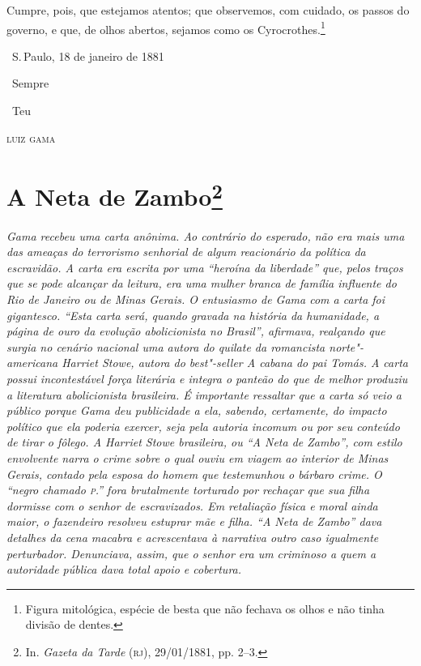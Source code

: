 Cumpre, pois, que estejamos atentos; que observemos, com cuidado, os
passos do governo, e que, de olhos abertos, sejamos como os
Cyrocrothes.\footnote{Figura mitológica, espécie de besta que não
  fechava os olhos e não tinha divisão de dentes.}

\hfill\ S.\,Paulo, 18 de janeiro de 1881\smallskip

\hfill\ Sempre

\hfill\ Teu

\hfill\textsc{luiz gama}


\chapter{A Neta de Zambo\footnote[*]{In.
  \emph{Gazeta da Tarde} (\textsc{rj}), 29/01/1881, pp. 2--3.}}

\begin{flushleft}
{\footnotesize\itshape
Gama recebeu uma carta anônima. Ao contrário do esperado,
não era mais uma das ameaças do terrorismo
senhorial de algum reacionário da política da escravidão.
A carta era escrita por uma ``heroína da liberdade'' que, pelos
traços que se pode alcançar da leitura, era uma mulher branca de família
influente do Rio de Janeiro ou de Minas Gerais. O entusiasmo de Gama com
a carta foi gigantesco. ``Esta carta será, quando gravada na história da
humanidade, a página de ouro da evolução abolicionista no Brasil'',
afirmava, realçando que surgia no cenário nacional uma autora do quilate
da romancista norte"-americana Harriet Stowe, autora do best"-seller \emph{A
cabana do pai Tomás}. A carta possui incontestável força literária e integra o panteão do que de
melhor produziu a literatura abolicionista brasileira.
É importante ressaltar que a carta só veio a
público porque Gama deu publicidade a ela, sabendo, certamente, do
impacto político que ela poderia exercer, seja pela autoria incomum ou
por seu conteúdo de tirar o fôlego. A Harriet
Stowe brasileira, ou ``A Neta de Zambo'', com estilo envolvente narra o crime sobre o qual ouviu em viagem ao interior de Minas Gerais, contado pela esposa do homem que
testemunhou o bárbaro crime. O ``negro chamado \textsc{p}.'' fora brutalmente torturado por
rechaçar que sua filha dormisse com o senhor de escravizados. Em
retaliação física e moral ainda maior, o fazendeiro resolveu estuprar
mãe e filha. ``A Neta de Zambo'' dava detalhes da cena macabra e
acrescentava à narrativa outro caso igualmente perturbador. Denunciava,
assim, que o senhor era um
criminoso a quem a autoridade pública dava total apoio e cobertura. }
\end{flushleft}\pagebreak

